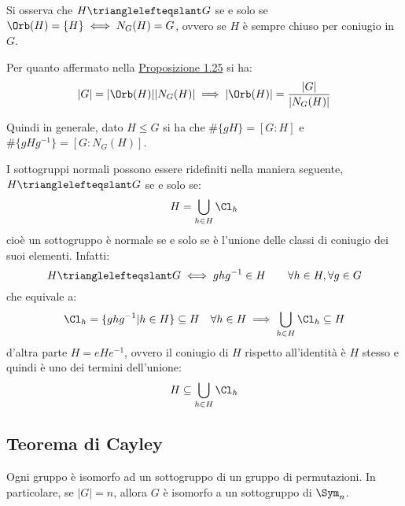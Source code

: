 \documentclass[11pt]{scrartcl}
\begin{document}
\begin{remark}
    Si osserva che $H \trianglelefteqslant G$ se e solo se $\Orb(H) = \{H\} \iff N_G(H) = G$, ovvero se $H$ è sempre chiuso per coniugio in $G$.
\end{remark}

Per quanto affermato nella \hyperref[p:1.25]{Proposizione 1.25} si ha:
    \[ |G| = |\Orb(H)||N_G(H)| \implies |\Orb(H)| = \frac{|G|}{|N_G(H)|}
    \]
\begin{remark}
    Quindi in generale, dato $H \leqslant G$ si ha che $\#\{gH\} = [G:H]$ e $\#\{gHg^{-1}\} = [G : N_G(H)]$.
\end{remark}

\begin{remark}
    I sottogruppi normali possono essere ridefiniti nella maniera seguente, $H \trianglelefteqslant G$ se e solo se:
        \[ H = \bigcup_{h \in H} \Cl_h
            \]
    cioè un sottogruppo è normale se e solo se è l'unione delle classi di coniugio dei suoi elementi. Infatti:
        \[ H \trianglelefteqslant G \iff ghg^{-1} \in H \qquad \forall h \in H, \forall g \in G
            \]
    che equivale a:
        \[ \Cl_h = \{ghg^{-1} | h \in H\} \subseteq H  \quad \forall h \in H \implies \bigcup_{h \in H} \Cl_h \subseteq H
            \]
    d'altra parte $H = eHe^{-1}$, ovvero il coniugio di $H$ rispetto all'identità è $H$ stesso e quindi è uno dei termini dell'unione:
        \[ H \subseteq \bigcup_{h \in H} \Cl_h
            \] 
    
\end{remark}

\newpage
\subsection{Teorema di Cayley}

\begin{theorem}
    \label{p:Cayley}
    Ogni gruppo è isomorfo ad un sottogruppo di un gruppo di permutazioni. In particolare, se $|G| = n$, allora 
    $G$ è isomorfo a un sottogruppo di $\Sym_n$.
\end{theorem}
\end{document}
